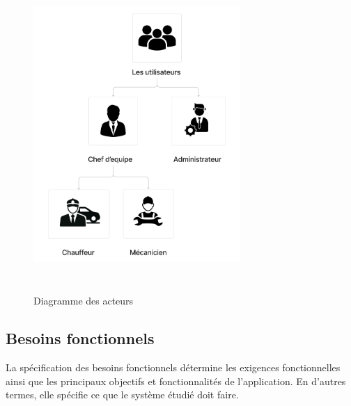 \begin{figure}[ht!]
  \centering
  \includegraphics[width=0.7\textwidth,height=12cm]{chap2.images/Diagramme des acteurs.png}
  \caption{Diagramme des acteurs}
\end{figure}







\subsection{Besoins fonctionnels}
La spécification des besoins fonctionnels détermine les exigences fonctionnelles ainsi que les principaux objectifs et fonctionnalités de l'application. En d'autres termes, elle spécifie ce que le système étudié doit faire.\\

